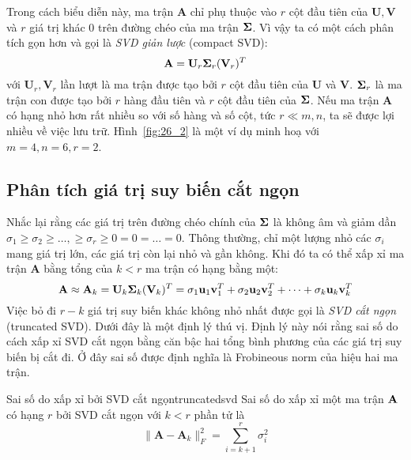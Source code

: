 Trong cách biểu diễn này, ma trận $\mathbf{A}$ chỉ phụ thuộc vào $r$ cột
đầu tiên của $\mathbf{U, V}$ và $r$ giá trị khác 0 trên đường chéo của ma trận
$\mathbf{\Sigma}$. Vì vậy ta có một cách phân tích {gọn} hơn và gọi là \textit{SVD giản lược} (compact SVD):
\begin{equation}
\mathbf{A} = {\mathbf{U}}_r{\mathbf{\Sigma}}_r({\mathbf{V}}_r)^T
\end{equation}
với $\mathbf{U}_r, \mathbf{V}_r $ lần lượt là ma trận được tạo bởi $r$ cột đầu
tiên của $\mathbf{U}$ và $\mathbf{V}$. $\mathbf{\Sigma}_r$ là ma trận con được tạo bởi
$r$ hàng đầu tiên và $r$ cột đầu tiên của $\mathbf{\Sigma}$. Nếu ma trận $\mathbf{A}$ có
hạng nhỏ hơn rất nhiều so với số hàng và số cột, tức $r \ll m, n$, ta sẽ được lợi
nhiều về việc lưu trữ. Hình~\ref{fig:26_2} là một ví dụ minh hoạ với $m = 4, n = 6, r = 2$.


\subsection{Phân tích giá trị suy biến cắt ngọn}
Nhắc lại rằng các giá trị trên đường chéo chính của $\mathbf{\Sigma}$ là không âm
và giảm dần $\sigma_1 \geq \sigma_2 \geq \dots, \geq \sigma_r \geq 0 = 0 = \dots
= 0$. Thông thường, chỉ một lượng nhỏ các $\sigma_i$ mang giá trị lớn, các giá
trị còn lại nhỏ và gần không. Khi đó ta có thể xấp xỉ ma trận $\mathbf{A}$
bằng tổng của $k < r$ ma trận có hạng bằng một:
\begin{equation}
\mathbf{A} \approx \mathbf{A}_k = \mathbf{U}_k \mathbf{\Sigma}_k (\mathbf{V}_k)^T = \sigma_1 \mathbf{u}_1 \mathbf{v}^T_1 + \sigma_2\mathbf{u}_2\mathbf{v}_2^T + \dots + \sigma_k\mathbf{u}_k\mathbf{v}_k^T
\end{equation}
Việc bỏ đi $r-k$ giá trị suy biến khác không nhỏ nhất được gọi là \textit{SVD cắt ngọn} (truncated SVD). Dưới đây là một định lý thú vị. Định lý này nói rằng sai số do cách xấp xỉ SVD cắt ngọn bằng căn bậc hai tổng bình phương của các giá trị suy biến bị cắt đi. Ở đây sai số được định nghĩa là Frobineous norm của
hiệu hai ma trận.
\begin{mytheo}{Sai số do xấp xỉ bởi SVD cắt ngọn}{truncatedsvd}
Sai số do xấp xỉ một ma trận $\mathbf{A}$ có hạng $r$ bởi SVD cắt ngọn với $k < r$ phần tử là
\begin{equation}
\|\mathbf{A} - \mathbf{A}_k\|_F^2 = \sum_{i = k + 1}^r \sigma_i^2
\end{equation}
\end{mytheo}

